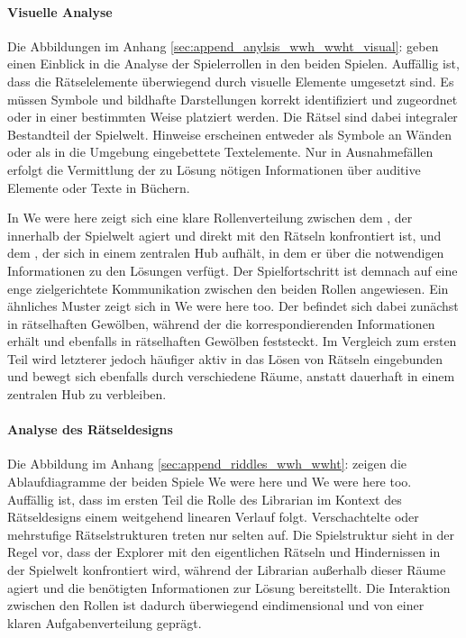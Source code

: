 \paragraph{Visuelle Analyse}
Die Abbildungen im Anhang \ref{sec:append_anylsis_wwh_wwht_visual}:  geben einen Einblick in die Analyse der Spielerrollen in den beiden Spielen. Auffällig ist, dass die Rätselelemente überwiegend durch visuelle Elemente umgesetzt sind. Es müssen Symbole und bildhafte Darstellungen korrekt identifiziert und zugeordnet oder in einer bestimmten Weise platziert werden. Die Rätsel sind dabei integraler Bestandteil der Spielwelt. Hinweise erscheinen entweder als Symbole an Wänden oder als in die Umgebung eingebettete Textelemente. Nur in Ausnahmefällen erfolgt die Vermittlung der zu Lösung nötigen Informationen über auditive Elemente oder Texte in Büchern.

In We were here zeigt sich eine klare Rollenverteilung zwischen dem , der innerhalb der Spielwelt agiert und direkt mit den Rätseln konfrontiert ist, und dem , der sich in einem zentralen Hub aufhält, in dem er über die notwendigen Informationen zu den Lösungen verfügt. Der Spielfortschritt ist demnach auf eine enge zielgerichtete Kommunikation zwischen den beiden Rollen angewiesen. Ein ähnliches Muster zeigt sich in  We were here too. Der  befindet sich dabei zunächst in rätselhaften Gewölben, während der  die korrespondierenden Informationen erhält und ebenfalls in rätselhaften Gewölben feststeckt. Im Vergleich zum ersten Teil wird letzterer jedoch häufiger aktiv in das Lösen von Rätseln eingebunden und bewegt sich ebenfalls durch verschiedene Räume, anstatt dauerhaft in einem zentralen Hub zu verbleiben.

\paragraph{Analyse des Rätseldesigns}
Die Abbildung im Anhang \ref{sec:append_riddles_wwh_wwht}:  zeigen die Ablaufdiagramme der beiden Spiele We were here und We were here too. Auffällig ist, dass im ersten Teil die Rolle des Librarian im Kontext des Rätseldesigns einem weitgehend linearen Verlauf folgt. Verschachtelte oder mehrstufige Rätselstrukturen treten nur selten auf. Die Spielstruktur sieht in der Regel vor, dass der Explorer mit den eigentlichen Rätseln und Hindernissen in der Spielwelt konfrontiert wird, während der Librarian außerhalb dieser Räume agiert und die benötigten Informationen zur Lösung bereitstellt. Die Interaktion zwischen den Rollen ist dadurch überwiegend eindimensional und von einer klaren Aufgabenverteilung geprägt.

